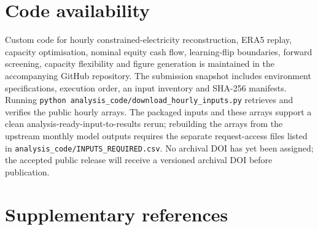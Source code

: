 \documentclass[11pt,a4paper]{article}
\begin{document}
\section*{Code availability}

Custom code for hourly constrained-electricity reconstruction, ERA5 replay, capacity optimisation, nominal equity cash flow, learning-flip boundaries, forward screening, capacity flexibility and figure generation is maintained in the accompanying GitHub repository. The submission snapshot includes environment specifications, execution order, an input inventory and SHA-256 manifests. Running \texttt{python analysis\_code/download\_hourly\_inputs.py} retrieves and verifies the public hourly arrays. The packaged inputs and these arrays support a clean analysis-ready-input-to-results rerun; rebuilding the arrays from the upstream monthly model outputs requires the separate request-access files listed in \texttt{analysis\_code/INPUTS\_REQUIRED.csv}. No archival DOI has yet been assigned; the accepted public release will receive a versioned archival DOI before publication.

\section*{Supplementary references}
\end{document}
